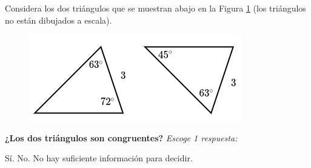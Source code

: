 \question[5] Considera los dos triángulos que se muestran abajo en la Figura \ref{fig:20230323155215} (los triángulos no están dibujados a escala).

\begin{figure}[H]
    \includegraphics[width=0.5\linewidth]{../images/20230323155215}
    \caption{}
    \label{fig:20230323155215}
\end{figure}

\textbf{¿Los dos triángulos son congruentes?}
\emph{Escoge 1 respuesta:}

\begin{choices}
    \CorrectChoice Sí.
    \choice No.
    \choice No hay suficiente información para decidir.
\end{choices}


